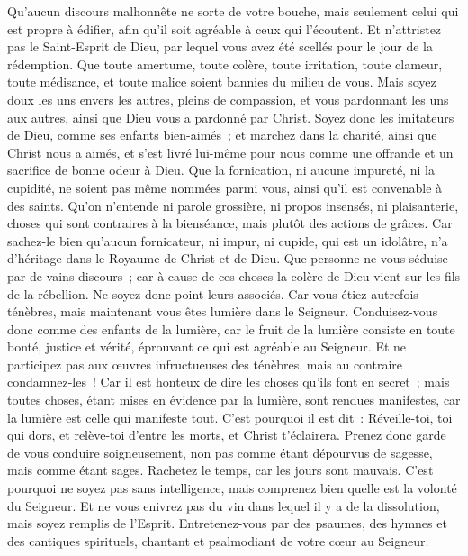 \begin{multicols}{2}
Qu'aucun discours malhonnête ne sorte de votre bouche, mais seulement celui qui est propre à édifier, afin qu'il soit agréable à ceux qui l'écoutent.
Et n'attristez pas le Saint-Esprit de Dieu, par lequel vous avez été scellés pour le jour de la rédemption.
Que toute amertume, toute colère, toute irritation, toute clameur, toute médisance, et toute malice soient bannies du milieu de vous.
Mais soyez doux les uns envers les autres, pleins de compassion, et vous pardonnant les uns aux autres, ainsi que Dieu vous a pardonné par Christ.
\VerseOne{}Soyez donc les imitateurs de Dieu, comme ses enfants bien-aimés~;
et marchez dans la charité, ainsi que Christ nous a aimés, et s'est livré lui-même pour nous comme une offrande et un sacrifice de bonne odeur à Dieu.
Que la fornication, ni aucune impureté, ni la cupidité, ne soient pas même nommées parmi vous, ainsi qu'il est convenable à des saints.
Qu'on n'entende ni parole grossière, ni propos insensés, ni plaisanterie, choses qui sont contraires à la bienséance, mais plutôt des actions de grâces.
Car sachez-le bien qu'aucun fornicateur, ni impur, ni cupide, qui est un idolâtre, n'a d'héritage dans le Royaume de Christ et de Dieu.
Que personne ne vous séduise par de vains discours~; car à cause de ces choses la colère de Dieu vient sur les fils de la rébellion.
Ne soyez donc point leurs associés.
Car vous étiez autrefois ténèbres, mais maintenant vous êtes lumière dans le Seigneur. Conduisez-vous donc comme des enfants de la lumière,
car le fruit de la lumière consiste en toute bonté, justice et vérité,
éprouvant ce qui est agréable au Seigneur.
Et ne participez pas aux œuvres infructueuses des ténèbres, mais au contraire condamnez-les~!
Car il est honteux de dire les choses qu'ils font en secret~;
mais toutes choses, étant mises en évidence par la lumière, sont rendues manifestes, car la lumière est celle qui manifeste tout.
C'est pourquoi il est dit~: Réveille-toi, toi qui dors, et relève-toi d'entre les morts, et Christ t'éclairera.
Prenez donc garde de vous conduire soigneusement, non pas comme étant dépourvus de sagesse, mais comme étant sages.
Rachetez le temps, car les jours sont mauvais.
C'est pourquoi ne soyez pas sans intelligence, mais comprenez bien quelle est la volonté du Seigneur.
Et ne vous enivrez pas du vin dans lequel il y a de la dissolution, mais soyez remplis de l'Esprit.
Entretenez-vous par des psaumes, des hymnes et des cantiques spirituels, chantant et psalmodiant de votre cœur au Seigneur.

\end{multicols}
